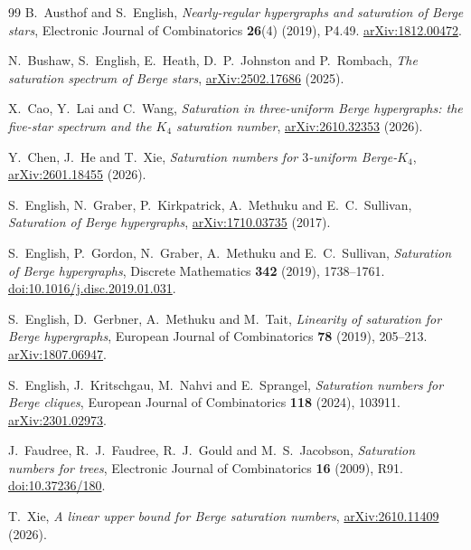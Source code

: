 \documentclass[11pt]{article}
\theoremstyle{definition}
\theoremstyle{remark}
\begin{document}
\begin{thebibliography}{99}
B.~Austhof and S.~English, \emph{Nearly-regular hypergraphs and saturation
of Berge stars}, Electronic Journal of Combinatorics \textbf{26}(4) (2019),
P4.49. \href{https://arxiv.org/abs/1812.00472}{arXiv:1812.00472}.

N.~Bushaw, S.~English, E.~Heath, D.~P.~Johnston and P.~Rombach,
\emph{The saturation spectrum of Berge stars},
\href{https://arxiv.org/abs/2502.17686}{arXiv:2502.17686} (2025).

X.~Cao, Y.~Lai and C.~Wang, \emph{Saturation in three-uniform Berge
hypergraphs: the five-star spectrum and the $K_4$ saturation number},
\href{https://arxiv.org/abs/2610.32353}{arXiv:2610.32353} (2026).

Y.~Chen, J.~He and T.~Xie, \emph{Saturation numbers for $3$-uniform
Berge-$K_4$}, \href{https://arxiv.org/abs/2601.18455}{arXiv:2601.18455}
(2026).

S.~English, N.~Graber, P.~Kirkpatrick, A.~Methuku and E.~C.~Sullivan,
\emph{Saturation of Berge hypergraphs},
\href{https://arxiv.org/abs/1710.03735}{arXiv:1710.03735} (2017).

S.~English, P.~Gordon, N.~Graber, A.~Methuku and E.~C.~Sullivan,
\emph{Saturation of Berge hypergraphs}, Discrete Mathematics
\textbf{342} (2019), 1738--1761.
\href{https://doi.org/10.1016/j.disc.2019.01.031}{doi:10.1016/j.disc.2019.01.031}.

S.~English, D.~Gerbner, A.~Methuku and M.~Tait,
\emph{Linearity of saturation for Berge hypergraphs}, European Journal of
Combinatorics \textbf{78} (2019), 205--213.
\href{https://arxiv.org/abs/1807.06947}{arXiv:1807.06947}.

S.~English, J.~Kritschgau, M.~Nahvi and E.~Sprangel, \emph{Saturation
numbers for Berge cliques}, European Journal of Combinatorics \textbf{118}
(2024), 103911. \href{https://arxiv.org/abs/2301.02973}{arXiv:2301.02973}.

J.~Faudree, R.~J.~Faudree, R.~J.~Gould and M.~S.~Jacobson,
\emph{Saturation numbers for trees}, Electronic Journal of Combinatorics
\textbf{16} (2009), R91.
\href{https://doi.org/10.37236/180}{doi:10.37236/180}.

T.~Xie, \emph{A linear upper bound for Berge saturation numbers},
\href{https://arxiv.org/abs/2610.11409}{arXiv:2610.11409} (2026).
\end{thebibliography}
\end{document}
